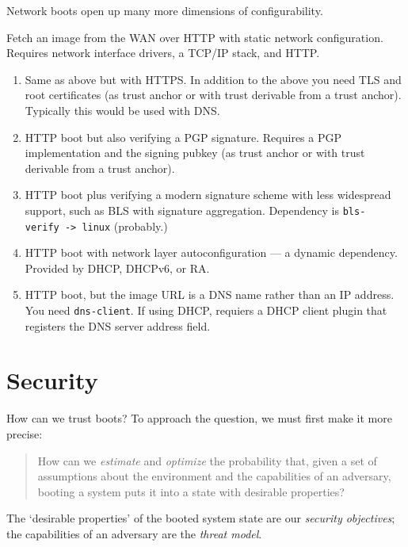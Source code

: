 Network boots open up many more dimensions of configurability.

\begin{example}

  Fetch an image from the WAN over HTTP with static network configuration. 
  Requires network interface drivers, a TCP/IP stack, and HTTP. 
  
  \begin{enumerate}
  \item Same as above but with HTTPS. 
  In addition to the above you need TLS and root certificates (as trust anchor or with trust derivable from a trust anchor). 
  Typically this would be used with DNS.

  \item HTTP boot but also verifying a PGP signature. 
  Requires a PGP implementation and the signing pubkey (as trust anchor or with trust derivable from a trust anchor). 
  
  \item HTTP boot plus verifying a modern signature scheme with less widespread support, such as BLS with signature aggregation. 
  Dependency is \texttt{bls-verify\ -\textgreater{}\ linux} (probably.) 
  
  \item HTTP boot with network layer autoconfiguration --- a dynamic dependency. 
  Provided by DHCP, DHCPv6, or RA. 
  
  \item HTTP boot, but the image URL is a DNS name rather than an IP address. 
  You need \texttt{dns-client}. If using DHCP, requiers a DHCP client plugin that registers the DNS server address field.
  \end{enumerate}

\end{example}

\newpage
\section{Security} \label{security}

How can we trust boots?
%
To approach the question, we must first make it more precise:
\begin{quote}
  How can we \emph{estimate} and \emph{optimize} the probability that, given a set of assumptions about the environment and the capabilities of an adversary, booting a system puts it into a state with desirable properties?
\end{quote}
The `desirable properties' of the booted system state are our \emph{security objectives}; the capabilities of an adversary are the \emph{threat model}.


